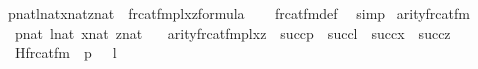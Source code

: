 \begin{isabellebody}
\ \ {\isachardoublequoteopen}{\isasymlbrakk}p{\isasymin}nat{\isacharsemicolon}{\kern0pt}l{\isasymin}nat{\isacharsemicolon}{\kern0pt}x{\isasymin}nat{\isacharsemicolon}{\kern0pt}z{\isasymin}nat{\isasymrbrakk}\ {\isasymLongrightarrow}\ frc{\isacharunderscore}{\kern0pt}at{\isacharunderscore}{\kern0pt}fm{\isacharparenleft}{\kern0pt}p{\isacharcomma}{\kern0pt}l{\isacharcomma}{\kern0pt}x{\isacharcomma}{\kern0pt}z{\isacharparenright}{\kern0pt}{\isasymin}formula{\isachardoublequoteclose}\isanewline
%
\isadelimproof
\ \ %
\endisadelimproof
%
\isatagproof
{}\isamarkupfalse%
\ frc{\isacharunderscore}{\kern0pt}at{\isacharunderscore}{\kern0pt}fm{\isacharunderscore}{\kern0pt}def\ \isamarkupfalse%
\ simp%
\endisatagproof
{\isafoldproof}%
%
\isadelimproof
\isanewline
%
\endisadelimproof
\isanewline
{}\isamarkupfalse%
\ arity{\isacharunderscore}{\kern0pt}frc{\isacharunderscore}{\kern0pt}at{\isacharunderscore}{\kern0pt}fm\ {\isacharcolon}{\kern0pt}\isanewline
\ \ \ {\isachardoublequoteopen}p{\isasymin}nat{\isachardoublequoteclose}\ {\isachardoublequoteopen}l{\isasymin}nat{\isachardoublequoteclose}\ {\isachardoublequoteopen}x{\isasymin}nat{\isachardoublequoteclose}\ {\isachardoublequoteopen}z{\isasymin}nat{\isachardoublequoteclose}\isanewline
\ \ \ {\isachardoublequoteopen}arity{\isacharparenleft}{\kern0pt}frc{\isacharunderscore}{\kern0pt}at{\isacharunderscore}{\kern0pt}fm{\isacharparenleft}{\kern0pt}p{\isacharcomma}{\kern0pt}l{\isacharcomma}{\kern0pt}x{\isacharcomma}{\kern0pt}z{\isacharparenright}{\kern0pt}{\isacharparenright}{\kern0pt}\ {\isacharequal}{\kern0pt}\ succ{\isacharparenleft}{\kern0pt}p{\isacharparenright}{\kern0pt}\ {\isasymunion}\ succ{\isacharparenleft}{\kern0pt}l{\isacharparenright}{\kern0pt}\ {\isasymunion}\ succ{\isacharparenleft}{\kern0pt}x{\isacharparenright}{\kern0pt}\ {\isasymunion}\ succ{\isacharparenleft}{\kern0pt}z{\isacharparenright}{\kern0pt}{\isachardoublequoteclose}\isanewline
%
\isadelimproof
%
\endisadelimproof
%
\isatagproof
{}\isamarkupfalse%
\ {\isacharminus}{\kern0pt}\isanewline
\ \ \isamarkupfalse%
\ {\isacharquery}{\kern0pt}{\isasymphi}\ {\isacharequal}{\kern0pt}\ {\isachardoublequoteopen}Hfrc{\isacharunderscore}{\kern0pt}at{\isacharunderscore}{\kern0pt}fm{\isacharparenleft}{\kern0pt}{}\ {\isacharhash}{\kern0pt}{\isacharplus}{\kern0pt}\ p{\isacharcomma}{\kern0pt}\ {}\ {\isacharhash}{\kern0pt}{\isacharplus}{\kern0pt}\ l{\isacharcomma}{\kern0pt}\ {}{\isacharcomma}{\kern0pt}\ {}{\isacharcomma}{\kern0pt}\ {}{\isacharparenright}{\kern0pt}{\isachardoublequoteclose}\isanewline

\end{isabellebody}
